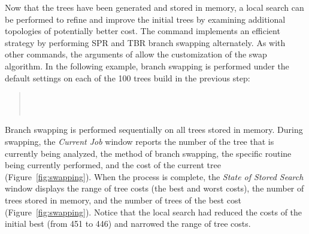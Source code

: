{Now that the trees have been generated and stored in memory, a local search can be performed to refine and improve the 
initial trees by examining additional topologies of potentially better cost.  The command  
implements an efficient strategy by performing SPR and TBR branch swapping alternately. As with other commands, 
the arguments of  allow the customization of the swap algorithm. In the following example, 
branch swapping is performed under the default settings on each of the 100 trees build in the previous step:

\begin{quote}
 	\\
 	\\
\end{quote}

Branch swapping is performed sequentially on all trees stored in memory. During swapping, the \emph{Current Job} 
window reports the number of the tree that is currently being analyzed, the method of branch swapping, the specific 
routine being currently performed, and the cost of the current tree (Figure~\ref{fig:swapping}). When the process is 
complete, the \emph{State of Stored Search} window displays the range of tree costs (the best and worst costs), the 
number of trees stored in memory, and the number of trees of the best cost (Figure~\ref{fig:swapping}). Notice that the 
local search had reduced the costs of the initial best (from 451 to 446) and narrowed the range of tree costs.

}

